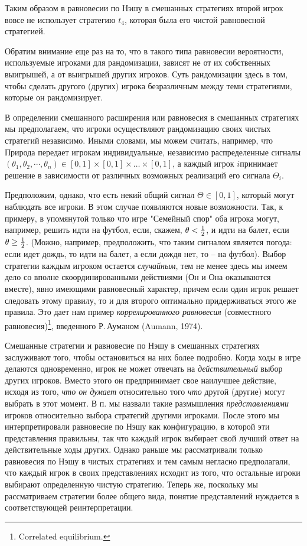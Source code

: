 \documentclass[12pt]{article}
\begin{document}
{Таким образом в равновесии по Нэшу в смешанных стратегиях второй
игрок вовсе не использует стратегию $t_4$, которая была его чистой
равновесной стратегией.

Обратим внимание еще раз на то, что в такого типа равновесии
вероятности, используемые игроками для рандомизации, зависят не от
их собственных выигрышей, а от выигрышей других игроков. Суть
рандомизации здесь в том, чтобы сделать другого (других) игрока
безразличным между теми стратегиями, которые он рандомизирует.


В определении смешанного расширения или равновесия в смешанных
стратегиях мы предполагаем, что игроки осуществляют рандомизацию
своих чистых стратегий независимо. Иными словами, мы можем считать,
например, что Природа передает игрокам индивидуальные, независимо
распределенные сигналы $(\theta_1,\theta_2,\cdots,\theta_n)
\in[0,1]\times [0,1]\times\ldots\times [0,1]$, а каждый игрок
$i$принимает решение в зависимости от различных возможных реализаций
его сигнала $\Theta_i$.

Предположим, однако, что есть некий общий сигнал $\Theta\in [0,1]$,
который могут наблюдать все игроки. В этом случае появляются новые
возможности. Так, к примеру, в упомянутой только что игре "Семейный
спор" оба игрока могут, например, решить идти на футбол, если,
скажем, $\theta<{{1}\over{2}}$, и идти на балет, если $\theta\ge
{{1}\over{2}}$. (Можно, например, предположить, что таким
сигналом является погода: если идет дождь, то идти на балет,
а если дождя нет, то -- на футбол). Выбор стратегии каждым игроком остается {\it
случайным}, тем не менее здесь мы имеем дело со вполне
скоординированными действиями (Он и Она оказываются вместе), явно
имеющими равновесный характер, причем если один игрок решает
следовать этому правилу, то и для второго оптимально придерживаться
этого же правила. Это дает нам пример {\it коррелированного
равновесия} (совместного равновесия)\footnote{ Correlated
equilibrium.}, введенного Р.\,Ауманом (Aumann, 1974).


Смешанные стратегии и равновесие по Нэшу в смешанных стратегиях
заслуживают того, чтобы остановиться на них более подробно. Когда
ходы в игре делаются одновременно, игрок не может отвечать на
\emph{действительный} выбор других игроков. Вместо этого он
предпринимает свое наилучшее действие, исходя из того, \emph{что он
думает} относительно того \emph{что} другой (другие) могут выбрать в
этот момент. В п.   мы назвали такие размышления
\emph{представлениями} игроков относительно выбора стратегий другими
игроками. После этого мы интерпретировали равновесие по Нэшу как
конфигурацию, в которой эти представления правильны, так что каждый
игрок выбирает свой лучший ответ на действительные ходы других.
Однако раньше мы рассматривали только равновесия по Нэшу в чистых
стратегиях и тем самым негласно предполагали, что каждый игрок в
своих представлениях исходит из того, что остальные игроки выбирают
определенную чистую стратегию. Теперь же, поскольку мы рассматриваем
стратегии более общего вида, понятие представлений нуждается в
соответствующей реинтерпретации.

}
\end{document}
